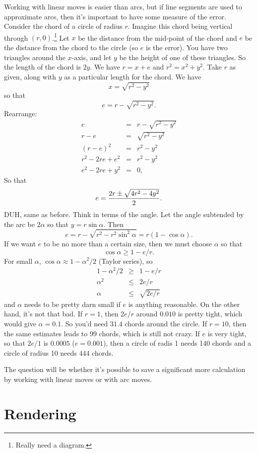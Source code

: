 \documentclass[titlepage,oneside,10pt]{article}
\begin{document}
Working with linear moves is easier than arcs, but if line segments
are used to approximate arcs, then it's important to have some measure
of the error. Consider the chord of a circle of radius $r$. Imagine
this chord being vertical through $(r,0)$.\footnote{Really need a
diagram.} Let $x$ be the distance from the mid-point of the chord and $e$
be the distance from the chord to the circle (so $e$ is the
error). You have two triangles around the $x$-axis, and let $y$ be the
height of one of these triangles. So the length of the chord is
$2y$. We have $r=x+e$ and $r^2=x^2+y^2$. Take $r$ as given, along with
$y$ as a particular length for the chord. We have
$$x = \sqrt{r^2-y^2}$$
so that
$$e = r -\sqrt{r^2-y^2}.$$
Rearrange:
\begin{eqnarray*}
  e &=& r -\sqrt{r^2-y^2}\\
  r-e &=& \sqrt{r^2-y^2}\\
  (r-e)^2 &=& r^2-y^2\\
  r^2-2re+e^2 &=& r^2-y^2\\
  e^2-2re + y^2 &=& 0,
\end{eqnarray*}
So that
$$e = {2r\pm\sqrt{4r^2-4y^2}\over2}.$$
DUH, same as before. Think in terms of the angle. Let the angle
subtended by the arc be $2\alpha$ so that $y=r\sin\alpha$. Then
$$e = r -\sqrt{r^2-r^2\sin^2\alpha} = r(1-\cos\alpha).$$
If we want $e$ to be no more than a certain size, then we must choose
$\alpha$ so that
$$\cos\alpha \geq 1-e/r.$$
For small $\alpha$, $\cos\alpha\approx 1-\alpha^2/2$ (Taylor series),
so
\begin{eqnarray*}
  1-\alpha^2/2 &\geq& 1-e/r \\
  \alpha^2 &\leq& 2e/r \\
  \alpha &\leq& \sqrt{2e/r}
\end{eqnarray*}
and $\alpha$ needs to be pretty darn small if $e$ is anything
reasonable. On the other hand, it's not that bad. If $r=1$, then
$2e/r$ around $0.010$ is pretty tight, which would give $\alpha =
0.1$. So you'd need $31.4$ chords around the circle. If $r=10$, then
the same estimates leads to 99 chords, which is still not crazy.
If $e$ is very tight, so that $2e/1$ is $0.0005$ ($e = 0.001$), then a
circle of radis 1 needs 140 chords and a circle of radius 10 needs 444
chords.

The question will be whether it's possible to save a significant
more calculation by working with linear moves or with arc moves.

\section{Rendering}
\end{document}
